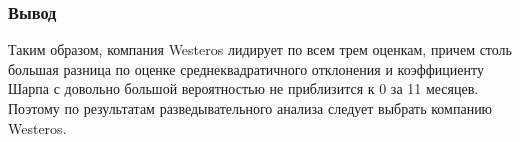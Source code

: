 ﻿\documentclass{beamer}
\begin{document}
\begin{frame}
\begin{flushleft}
\frametitle{Вывод}
\small{Таким образом, компания Westeros лидирует по всем трем оценкам, причем столь большая разница по оценке среднеквадратичного отклонения и коэффициенту Шарпа с довольно большой вероятностью не приблизится к 0 за 11 месяцев. Поэтому по результатам разведывательного анализа следует выбрать компанию Westeros.}
\end{flushleft}
\end{frame}
\end{document}

